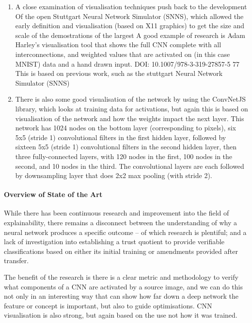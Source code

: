 \begin{enumerate}
    \item A close examination of visualisation techniques push back to the development Of the open Stuttgart Neural Network Simulator (SNNS), which allowed the early definition and visualisation (based on X11 graphics) to get the size and scale of the demostrations of the largest A good example of research is Adam Harley's visualisation tool that shows the full CNN complete with all interconnections, and weighted values that are activated on (in this case MNIST) data and a hand drawn input. DOI: 10.1007/978-3-319-27857-5 77  This is based on previous work, such as the stuttgart Neural Network Simulator (SNNS) 
    \item There is also some good visualisation of the network by using the ConvNetJS library, which looks at training data for activations, but again this is based on visualisation of the network and how the weights impact the next layer. This network has 1024 nodes on the bottom layer (corresponding to pixels), six 5x5 (stride 1) convolutional filters in the first hidden layer, followed by sixteen 5x5 (stride 1) convolutional filters in the second hidden layer, then three fully-connected layers, with 120 nodes in the first, 100 nodes in the second, and 10 nodes in the third. The convolutional layers are each followed by downsampling layer that does 2x2 max pooling (with stride 2). 
\end{enumerate}


\paragraph{Overview of State of the Art}
While there has been continuous research and improvement into the field of explainability, there remains a disconnect between the understanding of why a neural network produces a specific outcome – of which research is plentiful; and a lack of investigation into establishing a trust quotient to provide verifiable classifications based on either its initial training or amendments provided after transfer.

The benefit of the research is there is a clear metric and methodology to verify what components of a CNN are activated by a source image, and we can do this not only in an interesting way that can show how far down a deep network the feature or concept is important, but also to guide optimisations. CNN visualisation is also strong, but again based on the use not how it was trained.

